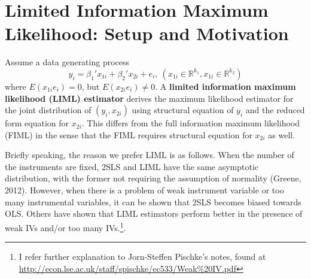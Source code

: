 \section{Limited Information Maximum Likelihood: Setup and Motivation}
Assume a data generating process
\[
y_ i = \beta_1' x_{1i}+ \beta_2' x_{2i}+e_i,\  (x_{1i}\in\mathbb{R}^{k_1}, x_{1i}\in\mathbb{R}^{k_2})
\]
where $E(x_{1i}e_i)=0$, but $E(x_{2i}e_i)\neq0$. A \textbf{limited information maximum likelihood (LIML) estimator} derives the maximum likelihood estimator for the joint distribution of $(y_i, x_{2i})$ using structural equation of $y_i$ and the reduced form equation for $x_{2i}$. This differs from the full information maximum likelihood (FIML) in the sense that the FIML requires structural equation for $x_{2i}$ as well. \par
Briefly speaking, the reason we prefer LIML is as follows. When the number of the instruments are fixed, 2SLS and LIML have the same asymptotic distribution, with the former not requiring the assumption of normality (Greene, 2012). However, when there is a problem of weak instrument variable or too many instrumental variables, it can be shown that 2SLS becomes biased towards OLS. Others have shown that LIML estimators perform better in the presence of weak IVs and/or too many IVs.\footnote{I refer further explanation to Jorn-Steffen Pischke's notes, found at \url{http://econ.lse.ac.uk/staff/spischke/ec533/Weak\%20IV.pdf}}. \par
